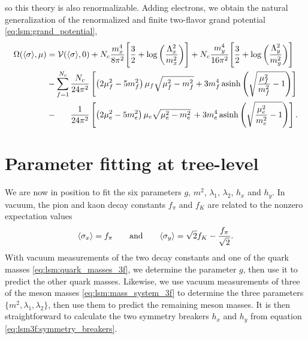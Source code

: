 so this theory is also renormalizable.
Adding electrons, we obtain the natural generalization of the renormalized and finite two-flavor grand potential \eqref{eq:lsm:grand_potential},
\begin{equation}
\begin{split}
	\Omega(\avg{\sigma},\mu) &= \pot(\avg{\sigma},0) + N_c \frac{m_x^4}{8 \pi^2} \Bigg[ \frac{3}{2} + \log\bigg(\frac{\Lambda_x^2}{m_x^2}\bigg) \Bigg] + N_c \frac{m_y^4}{16 \pi^2} \Bigg[ \frac{3}{2} + \log\bigg(\frac{\Lambda_y^2}{m_y^2}\bigg) \Bigg] \\ %
	                         &-\smashoperator{\sum_{f=1}^{N_c}} \frac{N_c}{24 \pi^2} \left[ \left( 2 \mu_f^2 - 5 m_f^2 \right) \mu_f \sqrt{\mu_f^2 - m_f^2} + 3 m_f^4 \asinh \left( \sqrt{\frac{\mu_{\smash{f}}^2}{m_f^2}-1} \right) \right] \\
	                         &-\phantom{\sum} \, \frac{1}{24 \pi^2} \left[ \left( 2 \mu_e^2 - 5 m_e^2 \right) \mu_e \sqrt{\mu_e^2 - m_e^2} \, + 3 m_e^4 \asinh \left( \sqrt{\frac{\mu_{\smash{e}}^2}{m_e^2}-1} \right) \right].
\end{split}
\label{eq:lsm3f:grand_potential}
\end{equation}

\section{Parameter fitting at tree-level}
\label{sec:lsm3f:parameter_fit}

We are now in position to fit the six parameters $g$, $m^2$, $\lambda_1$, $\lambda_2$, $h_x$ and $h_y$.
In vacuum, the pion and kaon decay constants $f_\pi$ and $f_K$ are related to the nonzero expectation values
\cite{ref:lsm3f_details}
\begin{equation}
	\langle \sigma_x \rangle = f_\pi
	\qquad \text{and} \qquad
	\langle \sigma_y \rangle = \sqrt{2} f_K - \frac{f_\pi}{\sqrt{2}}.
\label{eq:lsm3f:decay_constants}
\end{equation}
With vacuum measurements of the two decay constants and one of the quark masses \eqref{eq:lsm:quark_masses_3f},
we determine the parameter $g$, then use it to predict the other quark masses.
Likewise, we use vacuum measurements of three of the meson masses \eqref{eq:lsm:mass_system_3f} to determine the three parameters $\{m^2, \lambda_1, \lambda_2\}$,
then use them to predict the remaining meson masses.
It is then straightforward to calculate the two symmetry breakers $h_x$ and $h_y$ from equation \eqref{eq:lsm3f:symmetry_breakers}.

